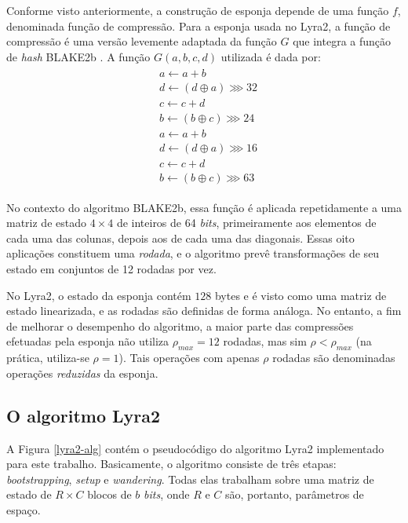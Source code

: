\documentclass{article}
\begin{document}
Conforme visto anteriormente, a construção de esponja depende de uma
função $f$, denominada função de compressão. Para a esponja usada no
Lyra2, a função de compressão é uma versão levemente adaptada da função
$G$ que integra a função de \emph{hash} BLAKE2b \cite{blake2b} . A função
$G(a, b, c, d)$ utilizada é dada por:
\begin{align*}
\begin{split}
& a \leftarrow a + b \\
& d \leftarrow \left(d \oplus a \right) \ggg 32 \\
& c \leftarrow c + d \\
& b \leftarrow \left(b \oplus c \right) \ggg 24 \\
& a \leftarrow a + b \\
& d \leftarrow \left(d \oplus a \right) \ggg 16 \\
& c \leftarrow c + d \\
& b \leftarrow \left(b \oplus c \right) \ggg 63
\end{split}
\end{align*}

No contexto do algoritmo BLAKE2b, essa função é aplicada repetidamente a
uma matriz de estado $4 \times 4$ de inteiros de 64 \emph{bits},
primeiramente aos elementos de cada uma das colunas, depois aos de cada
uma das diagonais. Essas oito aplicações constituem uma \emph{rodada}, e
o algoritmo prevê transformações de seu estado em conjuntos de 12
rodadas por vez.

No Lyra2, o estado da esponja contém $128$ bytes e é visto como uma
matriz de estado linearizada, e as rodadas são definidas de forma
análoga. No entanto, a fim de melhorar o desempenho do algoritmo, a
maior parte das compressões efetuadas pela esponja não utiliza
$\rho_{max} = 12$ rodadas, mas sim $\rho < \rho_{max}$ (na prática,
utiliza-se $\rho = 1$). Tais operações com apenas $\rho$ rodadas são
denominadas operações \emph{reduzidas} da esponja.

\subsection{O algoritmo Lyra2 }\label{sec-lyra2-alg}

A Figura \ref{lyra2-alg} contém o pseudocódigo do algoritmo Lyra2
implementado para este trabalho. Basicamente, o algoritmo consiste de três etapas: \emph{bootstrapping},
\emph{setup} e \emph{wandering}. Todas elas trabalham sobre uma matriz
de estado de $R \times C$ blocos de $b$ \emph{bits}, onde $R$ e $C$
são, portanto, parâmetros de espaço.
\end{document}
